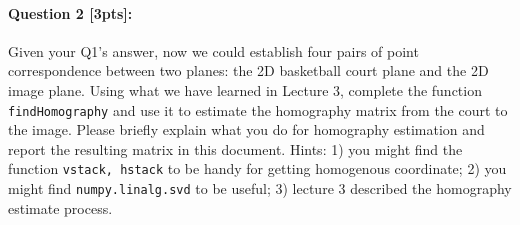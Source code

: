 \documentclass[11pt]{article}
\begin{document}
\paragraph{Question 2 [3pts]:}
Given your Q1's answer, now we could establish four pairs of point correspondence between two planes: the 2D basketball court plane and the 2D image plane. Using what we have learned in Lecture 3, complete the function \texttt{findHomography} and use it to estimate the homography matrix from the court to the image. Please briefly explain what you do for homography estimation and report the resulting matrix in this document. Hints: 1) you might find the function \texttt{vstack, hstack} to be handy for getting homogenous coordinate; 2) you might find \texttt{numpy.linalg.svd} to be useful; 3) lecture 3 described the homography estimate process. 

\end{document}
